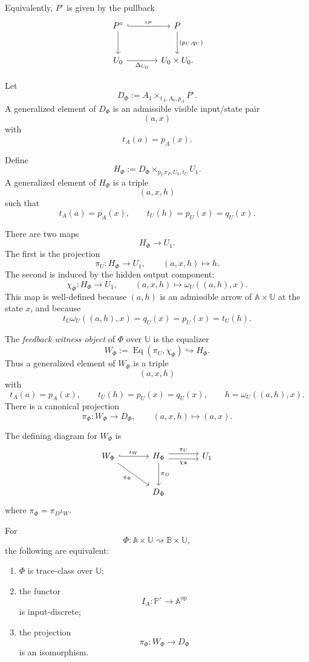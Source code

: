 Equivalently, \(P^\circ\) is given by the pullback
\[
\begin{tikzcd}[column sep=large,row sep=large]
P^\circ
  \arrow[r, hook, "\iota_P"]
  \arrow[d]
&
P
  \arrow[d, "{(p_U,q_U)}"]
\\
U_0
  \arrow[r, "\Delta_{U_0}"']
&
U_0\times U_0 .
\end{tikzcd}
\]

Let
\[
D_\Phi
:=
A_1\times_{t_A,A_0,p_A}P^\circ.
\]
A generalized element of \(D_\Phi\) is an admissible visible input/state pair
\[
(a,x)
\]
with
\[
t_A(a)=p_A(x).
\]

Define
\[
H_\Phi
:=
D_\Phi\times_{p_U\pi_P,U_0,t_U}U_1.
\]
A generalized element of \(H_\Phi\) is a triple
\[
(a,x,h)
\]
such that
\[
t_A(a)=p_A(x),
\qquad
t_U(h)=p_U(x)=q_U(x).
\]

There are two maps
\[
H_\Phi\to U_1.
\]
The first is the projection
\[
\pi_U:H_\Phi\to U_1,
\qquad
(a,x,h)\longmapsto h.
\]
The second is induced by the hidden output component:
\[
\chi_\Phi:H_\Phi\to U_1,
\qquad
(a,x,h)\longmapsto\omega_U((a,h),x).
\]
This map is well-defined because \((a,h)\) is an admissible arrow of
\(\mathbb A\times\mathbb U\) at the state \(x\), and because
\[
t_U\omega_U((a,h),x)=q_U(x)=p_U(x)=t_U(h).
\]

\begin{definition}
\label{def:feedback-witness-object}
The \emph{feedback witness object} of \(\Phi\) over \(\mathbb U\) is the
equalizer
\[
W_\Phi
:=
\operatorname{Eq}
\left(
\pi_U,\chi_\Phi
\right)
\hookrightarrow
H_\Phi.
\]
Thus a generalized element of \(W_\Phi\) is a triple
\[
(a,x,h)
\]
with
\[
t_A(a)=p_A(x),
\qquad
t_U(h)=p_U(x)=q_U(x),
\qquad
h=\omega_U((a,h),x).
\]
There is a canonical projection
\[
\pi_\Phi:W_\Phi\to D_\Phi,
\qquad
(a,x,h)\longmapsto(a,x).
\]
\end{definition}

The defining diagram for \(W_\Phi\) is
\[
\begin{tikzcd}[column sep=large,row sep=large]
W_\Phi
  \arrow[r, hook, "\iota_W"]
  \arrow[dr, "\pi_\Phi"']
&
H_\Phi
  \arrow[r, shift left=0.7ex, "\pi_U"]
  \arrow[r, shift right=0.7ex, "\chi_\Phi"']
  \arrow[d, "\pi_D"]
&
U_1
\\
&
D_\Phi
&
\end{tikzcd}
\]
where \(\pi_\Phi=\pi_D\iota_W\).

\begin{proposition}
\label{prop:internal-trace-class-criterion}
For
\[
\Phi:
\mathbb A\times\mathbb U
\rightsquigarrow
\mathbb B\times\mathbb U,
\]
the following are equivalent:
\begin{enumerate}
\item \(\Phi\) is trace-class over \(\mathbb U\);
\item the functor
\[
I_A:\mathbb P^\circ\to\mathbb A^{\mathrm{op}}
\]
is input-discrete;
\item the projection
\[
\pi_\Phi:W_\Phi\to D_\Phi
\]
is an isomorphism.
\end{enumerate}
\end{proposition}

